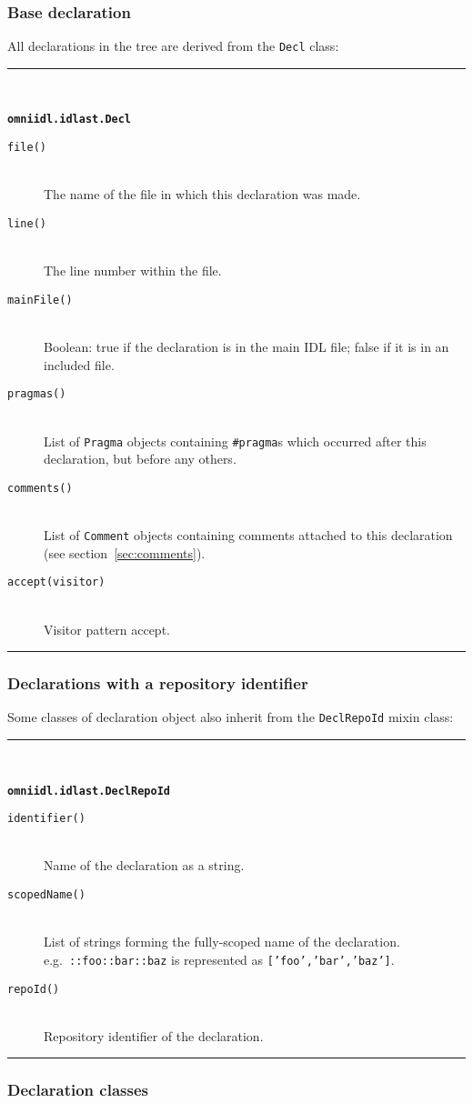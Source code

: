 \documentclass[11pt,twoside,a4paper]{article}
\newcommand{\func}[1]{\texttt{#1}}
\newcommand{\var}[1]{\texttt{#1}}
\newcommand{\class}[1]{\texttt{#1}}
\newcommand{\dfunc}[1]{\item[\func{#1}]\mbox{}\\}
\newenvironment{funcdesc}[1]%
  {\vspace{\baselineskip}%
   \noindent\begin{minipage}{\textwidth}%
   \noindent\rule{\textwidth}{1.5pt}\\%
   \centerline{\textbf{\texttt{#1}}}%
   \vspace{-.5\baselineskip}%
   \begin{description}}
  {\vspace{-\baselineskip}\end{description}%
   \noindent\rule{\textwidth}{1.5pt}\end{minipage}}
\begin{document}
\subsubsection{Base declaration}

All declarations in the tree are derived from the \class{Decl} class:

\begin{funcdesc}{omniidl.idlast.Decl}

\dfunc{file()}
  The name of the file in which this declaration was made.

\dfunc{line()}
  The line number within the file.

\dfunc{mainFile()}
  Boolean: true if the declaration is in the main IDL file; false if
  it is in an included file.

\dfunc{pragmas()}
  List of \class{Pragma} objects containing \texttt{\#pragma}s which
  occurred after this declaration, but before any others.

\dfunc{comments()}
  List of \class{Comment} objects containing comments attached to this
  declaration (see section~\ref{sec:comments}).

\dfunc{accept(visitor)}
  Visitor pattern accept.

\end{funcdesc}


\subsubsection{Declarations with a repository identifier}

Some classes of declaration object also inherit from the
\class{DeclRepoId} mixin class:

\begin{funcdesc}{omniidl.idlast.DeclRepoId}

\dfunc{identifier()}
  Name of the declaration as a string.

\dfunc{scopedName()}
  List of strings forming the fully-scoped name of the declaration.
  e.g.\ \var{::foo::bar::baz} is represented as
  \texttt{['foo','bar','baz']}.

\dfunc{repoId()}
  Repository identifier of the declaration.

\end{funcdesc}


\subsubsection{Declaration classes}
\end{document}
